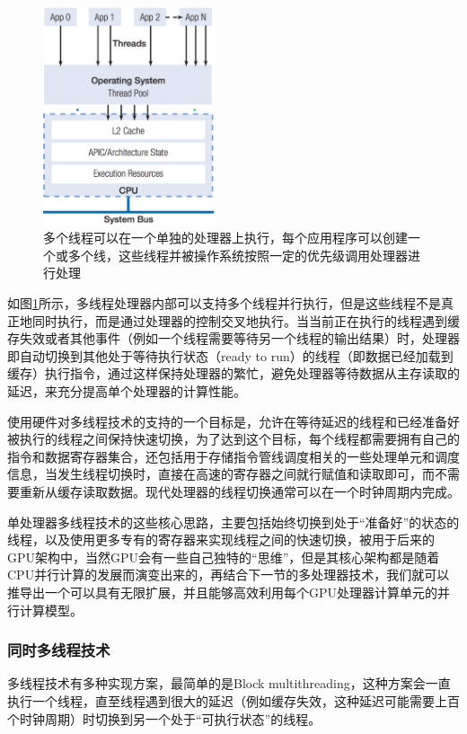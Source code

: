 \begin{figure}
	\sidecaption
	\includegraphics[width=0.45\textwidth]{figures/rp/multithreading}
	\caption{多个线程可以在一个单独的处理器上执行，每个应用程序可以创建一个或多个线，这些线程并被操作系统按照一定的优先级调用处理器进行处理}
	\label{f:rp-multithreading}
\end{figure}

如图\ref{f:rp-multithreading}所示，多线程处理器内部可以支持多个线程并行执行，但是这些线程不是真正地同时执行，而是通过处理器的控制交叉地执行。当当前正在执行的线程遇到缓存失效或者其他事件（例如一个线程需要等待另一个线程的输出结果）时，处理器即自动切换到其他处于等待执行状态（ready to run）的线程（即数据已经加载到缓存）执行指令，通过这样保持处理器的繁忙，避免处理器等待数据从主存读取的延迟，来充分提高单个处理器的计算性能。

使用硬件对多线程技术的支持的一个目标是，允许在等待延迟的线程和已经准备好被执行的线程之间保持快速切换，为了达到这个目标，每个线程都需要拥有自己的指令和数据寄存器集合，还包括用于存储指令管线调度相关的一些处理单元和调度信息，当发生线程切换时，直接在高速的寄存器之间就行赋值和读取即可，而不需要重新从缓存读取数据。现代处理器的线程切换通常可以在一个时钟周期内完成。

单处理器多线程技术的这些核心思路，主要包括始终切换到处于“准备好”的状态的线程，以及使用更多专有的寄存器来实现线程之间的快速切换，被用于后来的GPU架构中，当然GPU会有一些自己独特的“思维”，但是其核心架构都是随着CPU并行计算的发展而演变出来的，再结合下一节的多处理器技术，我们就可以推导出一个可以具有无限扩展，并且能够高效利用每个GPU处理器计算单元的并行计算模型。




\subsubsection{同时多线程技术}
多线程技术有多种实现方案，最简单的是Block multithreading，这种方案会一直执行一个线程，直至线程遇到很大的延迟（例如缓存失效，这种延迟可能需要上百个时钟周期）时切换到另一个处于“可执行状态”的线程。

